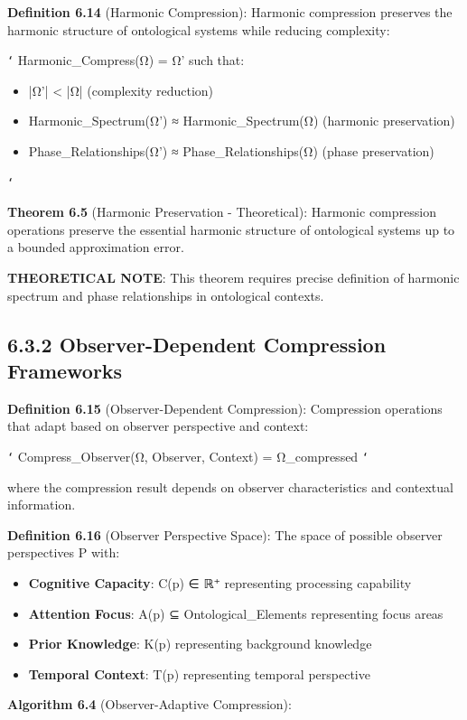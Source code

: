 \textbf{Definition 6.14} (Harmonic Compression): Harmonic compression preserves the harmonic structure of ontological systems while reducing complexity:

\texttt{`}
Harmonic_Compress(Ω) = Ω' such that:
\begin{itemize}
\item |Ω'| < |Ω| (complexity reduction)
\item Harmonic_Spectrum(Ω') ≈ Harmonic_Spectrum(Ω) (harmonic preservation)
\item Phase_Relationships(Ω') ≈ Phase_Relationships(Ω) (phase preservation)
\end{itemize}
\texttt{`}

\textbf{Theorem 6.5} (Harmonic Preservation - Theoretical): Harmonic compression operations preserve the essential harmonic structure of ontological systems up to a bounded approximation error.

\textbf{THEORETICAL NOTE}: This theorem requires precise definition of harmonic spectrum and phase relationships in ontological contexts.

\subsection{6.3.2 Observer-Dependent Compression Frameworks}

\textbf{Definition 6.15} (Observer-Dependent Compression): Compression operations that adapt based on observer perspective and context:

\texttt{`}
Compress_Observer(Ω, Observer, Context) = Ω_compressed
\texttt{`}

where the compression result depends on observer characteristics and contextual information.

\textbf{Definition 6.16} (Observer Perspective Space): The space of possible observer perspectives P with:

\begin{itemize}
\item \textbf{Cognitive Capacity}: C(p) ∈ ℝ⁺ representing processing capability
\item \textbf{Attention Focus}: A(p) ⊆ Ontological_Elements representing focus areas
\item \textbf{Prior Knowledge}: K(p) representing background knowledge
\item \textbf{Temporal Context}: T(p) representing temporal perspective
\end{itemize}

\textbf{Algorithm 6.4} (Observer-Adaptive Compression):

